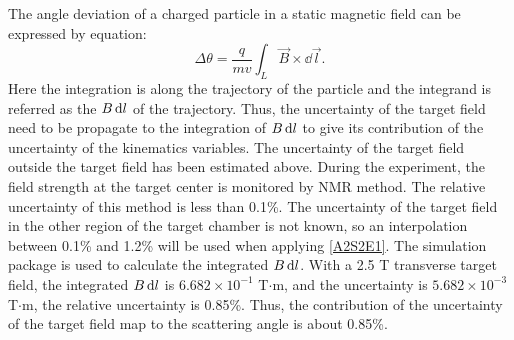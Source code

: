 The angle deviation of a charged particle in a static magnetic field can be expressed by equation:
\begin{equation} \label{A2S2E1}
\Delta\theta=\frac{q}{mv}\int_{L}\vec{B}\times\dd{\vec{l}}.
\end{equation}
Here the integration is along the trajectory of the particle and the integrand is referred as the $B\dd{l}$ of the trajectory. Thus, the uncertainty of the target field need to be propagate to the integration of $B\dd{l}$ to give its contribution of the uncertainty of the kinematics variables. The uncertainty of the target field outside the target field has been estimated above. During the experiment, the field strength at the target center is monitored by NMR method. The relative uncertainty of this method is less than 0.1\%. The uncertainty of the target field in the other region of the target chamber is not known, so an interpolation between 0.1\% and 1.2\% will be used when applying \cref{A2S2E1}. The simulation package is used to calculate the integrated $B\dd{l}$. With a 2.5 T transverse target field, the integrated $B\dd{l}$ is $6.682\times 10^{-1}$ T$\cdot$m, and the uncertainty is $5.682\times 10^{-3}$ T$\cdot$m, the relative uncertainty is 0.85\%. Thus, the contribution of the uncertainty of the target field map to the scattering angle is about 0.85\%.

\newpage
\cleardoublepage

